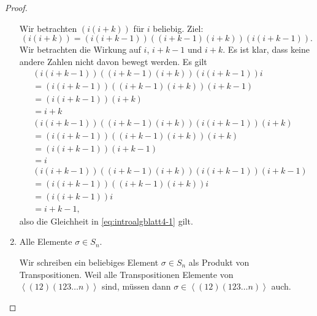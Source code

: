 \begin{proof}
\begin{enumerate}[label=(\roman*)]
			Wir betrachten $(i(i+k))$ f\"{u}r $i$ beliebig. Ziel:
			\begin{equation}\label{eq:introalgblatt4-1}
				(i(i+k))=(i(i+k-1))((i+k-1)(i+k))(i(i+k-1))
			.\end{equation} 
			Wir betrachten die Wirkung auf $i$, $i+k-1$ und $i+k$. Es ist klar, dass keine andere Zahlen nicht davon bewegt werden. Es gilt
\begin{align*}
	&(i(i+k-1))((i+k-1)(i+k))(i(i+k-1))i\\
	&=(i(i+k-1))((i+k-1)(i+k))(i+k-1)\\
	&=(i(i+k-1))(i+k)\\
	&= i+k\\
	&(i(i+k-1))((i+k-1)(i+k))(i(i+k-1))(i+k)\\
	&=(i(i+k-1))((i+k-1)(i+k))(i+k)\\
	&=(i(i+k-1))(i+k-1)\\
	&=i\\
	&(i(i+k-1))((i+k-1)(i+k))(i(i+k-1))(i+k-1)\\
	&=(i(i+k-1))((i+k-1)(i+k))i\\
	&=(i(i+k-1))i\\
	&=i+k-1,
\end{align*}
also die Gleichheit in \eqref{eq:introalgblatt4-1} gilt.
\item Alle Elemente $\sigma \in S_n$.

	Wir schreiben ein beliebiges Element $\sigma\in S_n$ als Produkt von Transpositionen. Weil alle Transpositionen Elemente von $\left<(12)(123\dots n) \right>$ sind, müssen dann $\sigma\in \left<(12)(123\dots n) \right>$ auch.\qedhere
	\end{enumerate}
\end{proof}
